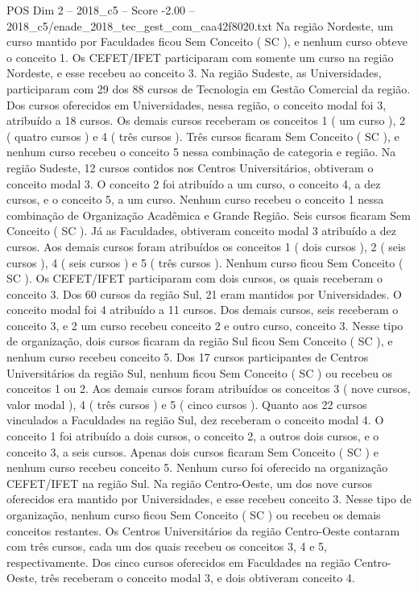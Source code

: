 \begin{textsample}{POS Dim 2 – 2018\_c5 – Score -2.00 – 2018\_c5/enade\_2018\_tec\_gest\_com\_caa42f8020.txt}
Na região Nordeste, um curso mantido por Faculdades ficou Sem Conceito ( SC ), e nenhum curso obteve o conceito 1.
Os CEFET/IFET participaram com somente um curso na região Nordeste, e esse recebeu ao conceito 3.
Na região Sudeste, as Universidades, participaram com 29 dos 88 cursos de Tecnologia em Gestão Comercial da região.
Dos cursos oferecidos em Universidades, nessa região, o conceito modal foi 3, atribuído a 18 cursos.
Os demais cursos receberam os conceitos 1 ( um curso ), 2 ( quatro cursos ) e 4 ( três cursos ).
Três cursos ficaram Sem Conceito ( SC ), e nenhum curso recebeu o conceito 5 nessa combinação de categoria e região.
Na região Sudeste, 12 cursos contidos nos Centros Universitários, obtiveram o conceito modal 3.
O conceito 2 foi atribuído a um curso, o conceito 4, a dez cursos, e o conceito 5, a um curso.
Nenhum curso recebeu o conceito 1 nessa combinação de Organização Acadêmica e Grande Região.
Seis cursos ficaram Sem Conceito ( SC ).
Já as Faculdades, obtiveram conceito modal 3 atribuído a dez cursos.
Aos demais cursos foram atribuídos os conceitos 1 ( dois cursos ), 2 ( seis cursos ), 4 ( seis cursos ) e 5 ( três cursos ).
Nenhum curso ficou Sem Conceito ( SC ).
Os CEFET/IFET participaram com dois cursos, os quais receberam o conceito 3.
Dos 60 cursos da região Sul, 21 eram mantidos por Universidades.
O conceito modal foi 4 atribuído a 11 cursos.
Dos demais cursos, seis receberam o conceito 3, e 2 um curso recebeu conceito 2 e outro curso, conceito 3.
Nesse tipo de organização, dois cursos ficaram da região Sul ficou Sem Conceito ( SC ), e nenhum curso recebeu conceito 5.
Dos 17 cursos participantes de Centros Universitários da região Sul, nenhum ficou Sem Conceito ( SC ) ou recebeu os conceitos 1 ou 2.
Aos demais cursos foram atribuídos os conceitos 3 ( nove cursos, valor modal ), 4 ( três cursos ) e 5 ( cinco cursos ).
Quanto aos 22 cursos vinculados a Faculdades na região Sul, dez receberam o conceito modal 4.
O conceito 1 foi atribuído a dois cursos, o conceito 2, a outros dois cursos, e o conceito 3, a seis cursos.
Apenas dois cursos ficaram Sem Conceito ( SC ) e nenhum curso recebeu conceito 5.
Nenhum curso foi oferecido na organização CEFET/IFET na região Sul.
Na região Centro-Oeste, um dos nove cursos oferecidos era mantido por Universidades, e esse recebeu conceito 3.
Nesse tipo de organização, nenhum curso ficou Sem Conceito ( SC ) ou recebeu os demais conceitos restantes.
Os Centros Universitários da região Centro-Oeste contaram com três cursos, cada um dos quais recebeu os conceitos 3, 4 e 5, respectivamente.
Dos cinco cursos oferecidos em Faculdades na região Centro-Oeste, três receberam o conceito modal 3, e dois obtiveram conceito 4.

\end{textsample}
